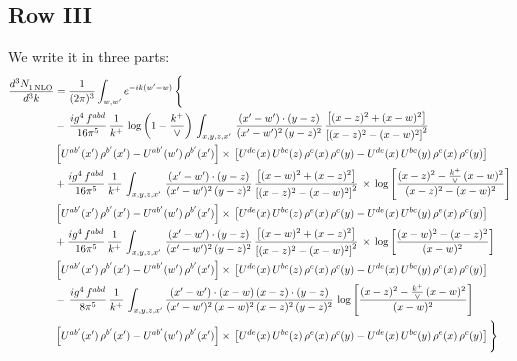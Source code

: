 \documentclass[9pt]{article}
\numberwithin{equation}{section}
\begin{document}
\subsection{Row III}
We write it in three parts:
\begin{align}
   \frac{d^{3}N_{1\,\rm NLO}^{\rm}}{d^{3}k}  & =  \frac{1}{(2\pi)^{3}}  \int_{w, w^\prime} e^{-ik(w^\prime-w)}\, \Bigg\{\notag \\
& -\,\frac{ig^{4}\,f^{abd}}{16\pi^{5}}\,\frac{1}{k^{+}}\,\log{\left(1-\frac{k^{+}}{\vee}\right)}\,\int_{x,y,z,x'}\, \frac{(x'-w')\cdot (y-z)}{(x'-w')^{2}\,(y-z)^{2}}\,\frac{\left[(x-z)^{2}+(x-w)^{2}\right]}{\left[(x-z)^{2}-(x-w)^{2}\right]^{2}}\notag \\ & \left[U^{ab'}(x')\,\rho^{b'}(x')-U^{ab'}(w')\, \rho^{b'}(x')\right]\times\, \left[U^{de}(x)\,U^{bc}(z)\, \rho^{e}(x)\,\rho^{c}(y)-U^{de}(x)\,U^{bc}(y)\,\rho^{e}(x)\,\rho^{c}(y)\right] \notag \\
&  +\frac{ig^{4}\,f^{abd}}{16\pi^{5}}\, \frac{1}{k^{+}}\,\int_{x,y,z,x'}\, \frac{(x'-w')\cdot (y-z)}{(x'-w')^{2}\,(y-z)^{2}}\, \frac{\left[(x-w)^{2}+(x-z)^{2}\right]}{\left[(x-z)^{2}-(x-w)^{2}\right]^{2}}\, \times\, \log{\left[\frac{(x-z)^{2}-\frac{k^{+}}{\vee}\,(x-w)^{2}}{(x-z)^{2}-(x-w)^{2}}\right]}\notag \\ & \left[U^{ab'}(x')\,\rho^{b'}(x')-U^{ab'}(w')\, \rho^{b'}(x')\right]\times\, \left[U^{de}(x)\,U^{bc}(z)\, \rho^{e}(x)\,\rho^{c}(y)-U^{de}(x)\,U^{bc}(y)\,\rho^{e}(x)\,\rho^{c}(y)\right] \notag \\
&  +\frac{ig^{4}\,f^{abd}}{16\pi^{5}}\, \frac{1}{k^{+}}\,\int_{x,y,z,x'}\, \frac{(x'-w')\cdot (y-z)}{(x'-w')^{2}\,(y-z)^{2}}\, \frac{\left[(x-w)^{2}+(x-z)^{2}\right]}{\left[(x-z)^{2}-(x-w)^{2}\right]^{2}}\, \times\, \log{\left[\frac{(x-w)^{2}-(x-z)^{2}}{(x-w)^{2}}\right]}\notag \\ & \left[U^{ab'}(x')\,\rho^{b'}(x')-U^{ab'}(w')\, \rho^{b'}(x')\right]\times\, \left[U^{de}(x)\,U^{bc}(z)\, \rho^{e}(x)\,\rho^{c}(y)-U^{de}(x)\,U^{bc}(y)\,\rho^{e}(x)\,\rho^{c}(y)\right] \notag \\
&-\, \frac{ig^{4}\,f^{abd}}{8\pi^{5}}\,\frac{1}{k^{+}}\,\int_{x,y,z,x'}\frac{(x'-w')\cdot (x-w)\, (x-z)\cdot (y-z)}{(x'-w')^{2}\, (x-w)^{2}\, (x-z)^{2}\, (y-z)^{2}}\,\log{\left[\frac{(x-z)^{2}-\frac{k^{+}}{\vee}\,(x-w)^{2}}{(x-w)^{2}}\right]} \notag \\ & \left[U^{ab'}(x')\,\rho^{b'}(x')-U^{ab'}(w')\, \rho^{b'}(x')\right]\times\, \left[U^{de}(x)\,U^{bc}(z)\, \rho^{e}(x)\,\rho^{c}(y)-U^{de}(x)\,U^{bc}(y)\,\rho^{e}(x)\,\rho^{c}(y)\right]\Bigg\}
\end{align}
\end{document}
